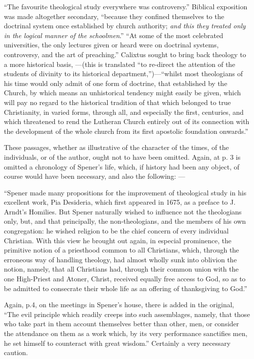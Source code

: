 ``The favourite theological study everywhere was
controversy.'' Biblical exposition was made altogether secondary, ``because
they confined themselves to the doctrinal system once established by
church authority; \emph{and this they treated only in the logical manner of
the schoolmen}.'' ``At some of the most celebrated universities, the
only lectures given or heard were on doctrinal systems, controversy, and
the art of preaching.'' Calixtus sought to bring back theology to a more
historical basis, —(this is translated ``to re-direct the attention of
the students of divinity to its historical department,'')—``whilst most
theologians of his time would only admit of one form of doctrine, that
established by the Church, by which means an unhistorical tendency might
easily be given, which will pay no regard to the historical tradition of
that which belonged to true Christianity, in varied forms, through all,
and especially the first, centuries, and which threatened to rend the
Lutheran Church entirely out of its connection with the development of
the whole church from its first apostolic foundation onwards.''

These passages, whether as illustrative of the
character of the times, of the individuals, or of the author, ought not
to have been omitted. Again, at p. 3 is omitted a chronology of Spener's
life, which, if history had been any object, of course would have been
necessary, and also the following: —

``Spener made many propositions for the improvement
of theological study in his excellent work, Pia Desideria, which first
appeared in 1675, as a preface to J. Arndt's Homilies. But Spener
naturally wished to influence not the theologians only, but, and that
principally, the non-theologians, and the members of his own
congregation: he wished religion to be the chief concern of every
individual Christian. With this view he brought out again, in especial
prominence, the primitive notion of a priesthood common to all
Christians, which, through the erroneous way of handling theology, had
almost wholly sunk into oblivion the notion, namely, that all Christians
had, through their common union with the one High-Priest and Atoner,
Christ, received equally free access to God, so as to be admitted to
consecrate their whole life as an offering of thanksgiving to God.''

Again, p.4, on the meetings in Spener's house,
there is added in the original, ``The evil principle which readily creeps
into such assemblages, namely, that those who take part in them account
themselves better than other, men, or consider
the attendance on them as a work which, by its very performance
sanctifies men, he set himself to counteract with great wisdom.''
Certainly a very necessary caution.

